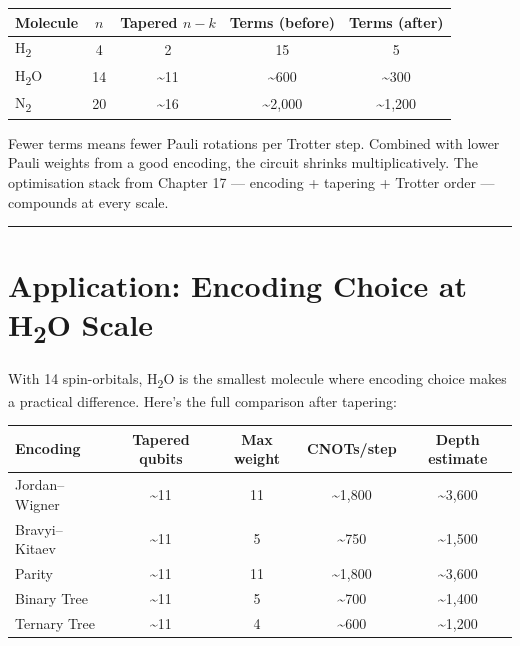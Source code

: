 \documentclass[
  11pt,
  oneside]{book}
\begin{document}
\begin{longtable}[]{@{}lcccc@{}}
\toprule\noalign{}
Molecule & \(n\) & Tapered \(n{-}k\) & Terms (before) & Terms (after) \\
\midrule\noalign{}
\endhead
\bottomrule\noalign{}
\endlastfoot
H\textsubscript{2} & 4 & 2 & 15 & 5 \\
H\textsubscript{2}O & 14 & \textasciitilde11 & \textasciitilde600 &
\textasciitilde300 \\
N\textsubscript{2} & 20 & \textasciitilde16 & \textasciitilde2,000 &
\textasciitilde1,200 \\
\end{longtable}

Fewer terms means fewer Pauli rotations per Trotter step. Combined with
lower Pauli weights from a good encoding, the circuit shrinks
multiplicatively. The optimisation stack from Chapter 17 --- encoding +
tapering + Trotter order --- compounds at every scale.

\begin{center}\rule{0.5\linewidth}{0.5pt}\end{center}

\section{Application: Encoding Choice at H\textsubscript{2}O
Scale}\label{application-encoding-choice-at-hux2082o-scale}

With 14 spin-orbitals, H\textsubscript{2}O is the smallest molecule where encoding
choice makes a practical difference. Here's the full comparison after
tapering:

\begin{longtable}[]{@{}lcccc@{}}
\toprule\noalign{}
Encoding & Tapered qubits & Max weight & CNOTs/step & Depth estimate \\
\midrule\noalign{}
\endhead
\bottomrule\noalign{}
\endlastfoot
Jordan--Wigner & \textasciitilde11 & 11 & \textasciitilde1,800 &
\textasciitilde3,600 \\
Bravyi--Kitaev & \textasciitilde11 & 5 & \textasciitilde750 &
\textasciitilde1,500 \\
Parity & \textasciitilde11 & 11 & \textasciitilde1,800 &
\textasciitilde3,600 \\
Binary Tree & \textasciitilde11 & 5 & \textasciitilde700 &
\textasciitilde1,400 \\
Ternary Tree & \textasciitilde11 & 4 & \textasciitilde600 &
\textasciitilde1,200 \\
\end{longtable}
\end{document}
